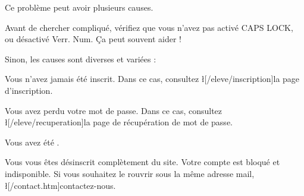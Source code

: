 Ce problème peut avoir plusieurs causes.

Avant de chercher compliqué, vérifiez que vous n'avez pas activé CAPS LOCK, ou désactivé Verr. Num. Ça peut souvent aider !

Sinon, les causes sont diverses et variées :
\item Vous n'avez jamais été inscrit. Dans ce cas, consultez \l[/eleve/inscription]{la page d'inscription}.
\item Vous avez perdu votre mot de passe. Dans ce cas, consultez \l[/eleve/recuperation]{la page de récupération de mot de passe}.
\item Vous avez été .
\item Vous vous êtes désinscrit complètement du site. Votre compte est bloqué et indisponible. Si vous souhaitez le rouvrir sous la même adresse mail, \l[/contact.htm]{contactez-nous}.
